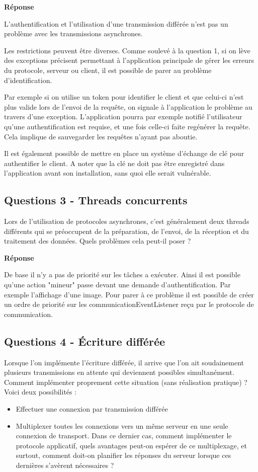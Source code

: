 \documentclass[francais,12pt]{article}
\begin{document}
	
	{\color[rgb]{0,0.5,0.23}\textbf{Réponse}}
	
	L'authentification et l'utilisation d'une transmission différée n'est pas un problème avec les transmissions asynchrones. 
	
	Les restrictions peuvent être diverses. Comme soulevé à la question 1, si on lève des exceptions précisent permettant à l'application principale de gérer les erreurs du protocole, serveur ou client, il est possible de parer au problème d'identification. 
	
	Par exemple si on utilise un token pour identifier le client et que celui-ci n'est plus valide lors de l'envoi de la requête, on signale à l'application le problème au travers d'une exception. L'application pourra par exemple notifié l'utilisateur qu'une authentification est requise, et une fois celle-ci faite regénérer la requête. Cela implique de sauvegarder les requêtes n'ayant pas aboutie. 
	
	Il est également possible de mettre en place un système d'échange de clé pour authentifier le client. A noter que la clé ne doit pas être enregistré dans l'application avant son installation, sans quoi elle serait vulnérable.
	
	\subsection*{Questions 3 - Threads concurrents}
	Lors de l'utilisation de protocoles asynchrones, c'est généralement deux threads différents qui se préoccupent de la préparation, de l'envoi, de la réception et du traitement des données. Quels problèmes cela peut-il poser ?
	
	{\color[rgb]{0,0.5,0.23}\textbf{Réponse}}
	
	De base il n'y a pas de priorité sur les tâches a exécuter. Ainsi il est possible qu'une action "mineur" passe devant une demande d'authentification. Par exemple l'affichage d'une image. Pour parer à ce problème il est possible de créer un ordre de priorité sur les communicationEventListener reçu par le protocole de communication. 
	
	\subsection*{Questions 4 - Écriture différée}    
	Lorsque l'on implémente l'écriture différée, il arrive que l'on ait soudainement plusieurs transmissions en attente qui deviennent possibles simultanément. Comment implémenter proprement cette situation (sans réalisation pratique) ? Voici deux possibilités :
	\begin{itemize}
		\item Effectuer une connexion par transmission différée
		\item Multiplexer toutes les connexions vers un même serveur en une seule connexion de transport. Dans ce dernier cas, comment implémenter le protocole applicatif, quels avantages peut-on espérer de ce multiplexage, et surtout, comment doit-on planifier les réponses du serveur lorsque ces dernières s'avèrent nécessaires ?
	\end{itemize}
	
\end{document}
